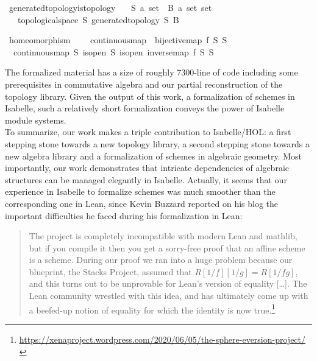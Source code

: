 \documentclass[12pt]{scrartcl}
\begin{document}
\begin{isabelle}
\isamarkupfalse%
\ generated{\isacharunderscore}{\kern0pt}topology{\isacharunderscore}{\kern0pt}is{\isacharunderscore}{\kern0pt}topology{\isacharcolon}{\kern0pt}\isanewline
\ \ \ S{\isacharcolon}{\kern0pt}{\isacharcolon}{\kern0pt}\ {\isachardoublequoteopen}{\isacharprime}{\kern0pt}a\ set{\isachardoublequoteclose}\ \ B{\isacharcolon}{\kern0pt}{\isacharcolon}{\kern0pt}\ {\isachardoublequoteopen}{\isacharprime}{\kern0pt}a\ set\ set{\isachardoublequoteclose}\isanewline
\ \ \ {\isachardoublequoteopen}topological{\isacharunderscore}{\kern0pt}space\ S\ {\isacharparenleft}{\kern0pt}generated{\isacharunderscore}{\kern0pt}topology\ S\ B{\isacharparenright}{\kern0pt}{\isachardoublequoteclose}
\end{isabelle}
\begin{isabelle}
\isamarkupfalse%
\ homeomorphism\ {\isacharequal}{\kern0pt}\ \isanewline
\ \ continuous{\isacharunderscore}{\kern0pt}map\ {\isacharplus}{\kern0pt}\ bijective{\isacharunderscore}{\kern0pt}map\ f\ S\ S{\isacharprime}{\kern0pt}\ {\isacharplus}{\kern0pt}\ \isanewline
\ \ continuous{\isacharunderscore}{\kern0pt}map\ S{\isacharprime}{\kern0pt}\ is{\isacharunderscore}{\kern0pt}open{\isacharprime}{\kern0pt}\ S\ is{\isacharunderscore}{\kern0pt}open\ {\isachardoublequoteopen}inverse{\isacharunderscore}{\kern0pt}map\ f\ S\ S{\isacharprime}{\kern0pt}{\isachardoublequoteclose}
\end{isabelle}
The formalized material has a size of roughly 7300-line of code including some prerequisites in commutative  algebra and our partial reconstruction of the topology library. Given the output of this work, a formalization of schemes in Isabelle, such a relatively short formalization conveys the power of Isabelle module systems. \\
To summarize, our work makes a triple contribution to Isabelle/HOL: a first stepping stone towards a new topology library, a second stepping stone towards a new algebra library and a formalization of schemes in algebraic geometry. Most importantly, our work demonstrates that intricate dependencies of algebraic structures can be managed elegantly in Isabelle. 
Actually, it seems that our experience in Isabelle to formalize schemes was much smoother than the corresponding one in Lean, since Kevin Buzzard reported on his blog the important difficulties he faced during his formalization in Lean:
\begin{quote}
	The project is completely incompatible with modern Lean and mathlib, but if you compile it then you get a sorry-free proof that an affine scheme is a scheme. During our proof we ran into a huge problem because our blueprint, the Stacks Project, assumed that $R[1/f][1/g]=R[1/fg]$, and this turns out to be unprovable for Lean’s version of equality [\dots]. The Lean community wrestled with this idea, and has ultimately come up with a beefed-up notion of equality for which the identity is now true.\footnote{\url{https://xenaproject.wordpress.com/2020/06/05/the-sphere-eversion-project/}}
\end{quote}	
\end{document}
